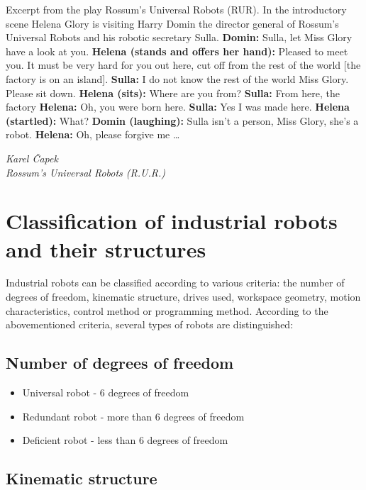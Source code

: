 \epigraph{

Excerpt from the play Rossum’s Universal Robots (RUR).\break
In the introductory scene Helena Glory is visiting Harry Domin the director general of Rossum’s Universal Robots and his robotic secretary Sulla.\break
\break
\textbf{Domin:} Sulla, let Miss Glory have a look at you.\break
\textbf{Helena (stands and offers her hand):} Pleased to meet you. It must be very hard for you out here, cut off from the rest of the world [the factory is on an island].\break
\textbf{Sulla:} I do not know the rest of the world Miss Glory. Please sit down.\break
\textbf{Helena (sits):} Where are you from?\break
\textbf{Sulla:} From here, the factory\break
\textbf{Helena:} Oh, you were born here.\break
\textbf{Sulla:} Yes I was made here.\break
\textbf{Helena (startled):} What?\break
\textbf{Domin (laughing):} Sulla isn’t a person, Miss Glory, she’s a robot.\break
\textbf{Helena:} Oh, please forgive me …
}{\textit{Karel Čapek \\ Rossum’s Universal Robots (R.U.R.)}}

\section{Classification of industrial robots and their structures}

Industrial robots can be classified according to various criteria: the number of degrees of freedom, kinematic structure, drives used, workspace geometry, motion characteristics, control method or programming method. According to the abovementioned criteria, several types of robots are distinguished:

\subsection*{Number of degrees of freedom}

\begin{itemize}
    \item Universal robot - 6 degrees of freedom
    \item Redundant robot - more than 6 degrees of freedom
    \item Deficient robot - less than 6 degrees of freedom
\end{itemize}

\subsection*{Kinematic structure}

